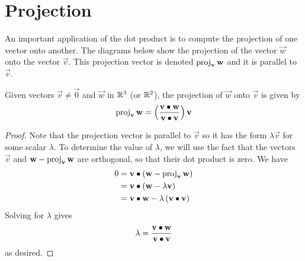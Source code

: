 \documentclass[handout]{ximera}
\begin{document}
\section{Projection}

An important application of the dot product is to compute the projection of one vector onto another.
The diagrams below show the projection of the vector $\vec{w}$ onto the vector $\vec{v}$. This projection vector is denoted $\operatorname{proj}_{\mathbf{v}} \mathbf{w}$
and it is parallel to $\vec{v}$.

\begin{image}
\end{image}

\begin{proposition}
Given vectors $\vec{v} \neq \vec{0}$ and $\vec{w}$ in $\mathbb R^3$ (or $\mathbb R^2$), the projection of $\vec{w}$ onto $\vec{v}$ is given by
\[
\operatorname{proj}_{\mathbf{v}} \mathbf{w} = \left(\frac{\mathbf{v} \bullet \mathbf{w}}{\mathbf{v} \bullet \mathbf{v}}\right) \mathbf{v}
\]


\begin{proof}
Note that the projection vector is parallel to $\vec{v}$ so it has the form $\lambda \vec{v}$ for some scalar $\lambda$.
To determine the value of $\lambda$, we will use the fact that the vectors $\vec{v}$ and $\mathbf{w} - \operatorname{proj}_{\mathbf{v}} \mathbf{w}$ are orthogonal, 
so that their dot product is zero. We have
\begin{align*}
0 &= \mathbf{v} \bullet \left(\mathbf{w} - \operatorname{proj}_{\mathbf{v}} \mathbf{w} \right)\\
  &= \mathbf{v} \bullet \left(\mathbf{w} - \lambda \mathbf{v}\right)\\
  &= \mathbf{v} \bullet \mathbf{w} - \lambda \left( \mathbf{v} \bullet \mathbf{v} \right)
\end{align*}
Solving for $\lambda$ gives
\[
\lambda = \frac{\mathbf{v} \bullet \mathbf{w}}{\mathbf{v} \bullet \mathbf{v}}
\]
as desired.
\end{proof}
\end{proposition}
\end{document}
